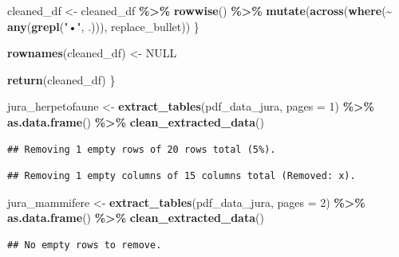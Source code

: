 \documentclass[
  french,
]{book}
\newenvironment{Shaded}{\begin{snugshade}}{\end{snugshade}}
\newcommand{\DataTypeTok}[1]{\textcolor[rgb]{0.13,0.29,0.53}{#1}}
\newcommand{\DecValTok}[1]{\textcolor[rgb]{0.00,0.00,0.81}{#1}}
\newcommand{\KeywordTok}[1]{\textcolor[rgb]{0.13,0.29,0.53}{\textbf{#1}}}
\newcommand{\NormalTok}[1]{#1}
\newcommand{\OperatorTok}[1]{\textcolor[rgb]{0.81,0.36,0.00}{\textbf{#1}}}
\newcommand{\OtherTok}[1]{\textcolor[rgb]{0.56,0.35,0.01}{#1}}
\newcommand{\StringTok}[1]{\textcolor[rgb]{0.31,0.60,0.02}{#1}}
\begin{document}
\begin{Shaded}
\begin{Highlighting}[]
\NormalTok{    cleaned\_df \textless{}{-}}\StringTok{ }\NormalTok{cleaned\_df }\OperatorTok{\%\textgreater{}\%}
\StringTok{      }\KeywordTok{rowwise}\NormalTok{() }\OperatorTok{\%\textgreater{}\%}
\StringTok{      }\KeywordTok{mutate}\NormalTok{(}\KeywordTok{across}\NormalTok{(}\KeywordTok{where}\NormalTok{(}\OperatorTok{\textasciitilde{}}\StringTok{ }\KeywordTok{any}\NormalTok{(}\KeywordTok{grepl}\NormalTok{(}\StringTok{"•"}\NormalTok{, .))), replace\_bullet))}
\NormalTok{  \}}
  
  \KeywordTok{rownames}\NormalTok{(cleaned\_df) \textless{}{-}}\StringTok{ }\OtherTok{NULL}
  
  \KeywordTok{return}\NormalTok{(cleaned\_df)}
\NormalTok{\}}
\end{Highlighting}
\end{Shaded}

\begin{Shaded}
\begin{Highlighting}[]
\NormalTok{jura\_herpetofaune \textless{}{-}}\StringTok{ }\KeywordTok{extract\_tables}\NormalTok{(pdf\_data\_jura, }\DataTypeTok{pages =} \DecValTok{1}\NormalTok{) }\OperatorTok{\%\textgreater{}\%}\StringTok{ }
\StringTok{  }\KeywordTok{as.data.frame}\NormalTok{() }\OperatorTok{\%\textgreater{}\%}
\StringTok{  }\KeywordTok{clean\_extracted\_data}\NormalTok{()}
\end{Highlighting}
\end{Shaded}

\begin{verbatim}
## Removing 1 empty rows of 20 rows total (5%).
\end{verbatim}

\begin{verbatim}
## Removing 1 empty columns of 15 columns total (Removed: x).
\end{verbatim}

\begin{Shaded}
\begin{Highlighting}[]
\NormalTok{jura\_mammifere \textless{}{-}}\StringTok{ }\KeywordTok{extract\_tables}\NormalTok{(pdf\_data\_jura, }\DataTypeTok{pages =} \DecValTok{2}\NormalTok{) }\OperatorTok{\%\textgreater{}\%}
\StringTok{  }\KeywordTok{as.data.frame}\NormalTok{() }\OperatorTok{\%\textgreater{}\%}
\StringTok{  }\KeywordTok{clean\_extracted\_data}\NormalTok{()}
\end{Highlighting}
\end{Shaded}

\begin{verbatim}
## No empty rows to remove.
\end{verbatim}
\end{document}
